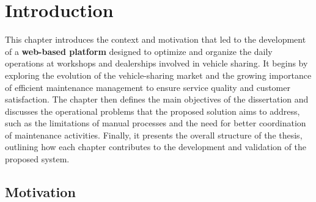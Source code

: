 \chapter{Introduction}%
\label{chapter:introduction}

\begin{introduction}


This chapter introduces the context and motivation that led to the development of a \textbf{web-based platform} designed to optimize and organize the daily operations at workshops and dealerships involved in vehicle sharing. It begins by exploring the evolution of the vehicle-sharing market and the growing importance of efficient maintenance management to ensure service quality and customer satisfaction. The chapter then defines the main objectives of the dissertation and discusses the operational problems that the proposed solution aims to address, such as the limitations of manual processes and the need for better coordination of maintenance activities. Finally, it presents the overall structure of the thesis, outlining how each chapter contributes to the development and validation of the proposed system.

\end{introduction} 


\section{Motivation}

